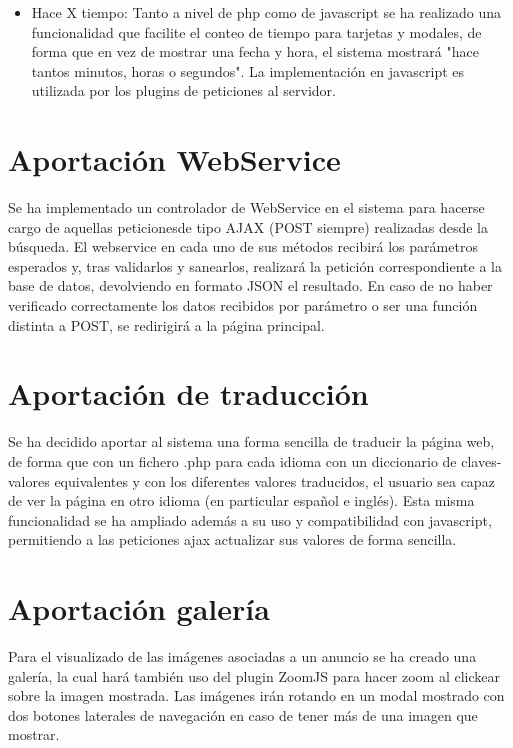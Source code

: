 \begin{itemize}
\item Hace X tiempo: Tanto a nivel de php como de javascript se ha realizado una funcionalidad que facilite el conteo de tiempo
para tarjetas y modales, de forma que en vez de mostrar una fecha y hora, el sistema mostrar\'{a} "hace tantos minutos, horas o segundos".
La implementaci\'{o}n en javascript es utilizada por los plugins de peticiones al servidor.

\end{itemize}

\section{Aportaci\'{o}n WebService}
 Se ha implementado un controlador de WebService en el sistema para hacerse cargo de aquellas peticionesde tipo 
 AJAX (POST siempre) realizadas desde la b\'{u}squeda. El webservice en cada uno de sus m\'{e}todos recibir\'{a} los par\'{a}metros
 esperados y, tras validarlos y sanearlos, realizar\'{a} la petici\'{o}n correspondiente a la base de datos, devolviendo 
 en formato JSON el resultado. En caso de no haber verificado correctamente los datos recibidos por par\'{a}metro
 o ser una funci\'{o}n distinta a POST, se redirigir\'{a} a la p\'{a}gina principal.


\section{Aportaci\'{o}n de traducci\'{o}n}

Se ha decidido aportar al sistema una forma sencilla de traducir la p\'{a}gina web, de forma que con un fichero .php para cada idioma con un
diccionario de claves-valores equivalentes y con los diferentes valores traducidos, el usuario sea capaz de ver la p\'{a}gina
en otro idioma (en particular espa\~{n}ol e ingl\'{e}s). Esta misma funcionalidad se ha ampliado adem\'{a}s a su uso y compatibilidad con javascript,
permitiendo a las peticiones ajax actualizar sus valores de forma sencilla.


\section{Aportaci\'{o}n galer\'{i}a}
Para el visualizado de las im\'{a}genes asociadas a un anuncio se ha creado una galer\'{i}a, la cual har\'{a} tambi\'{e}n uso del plugin ZoomJS para
hacer zoom al clickear sobre la imagen mostrada. Las im\'{a}genes ir\'{a}n rotando en un modal mostrado con dos botones laterales de navegaci\'{o}n
en caso de tener m\'{a}s de una imagen que mostrar.

